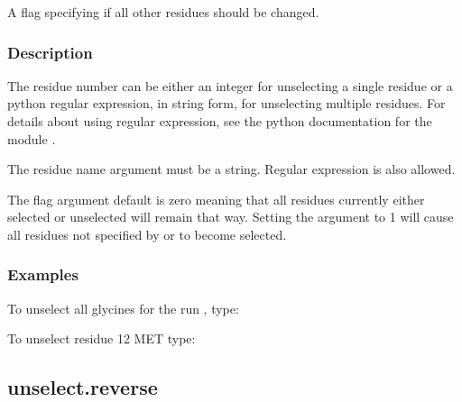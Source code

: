    A flag specifying if all other residues should be changed.  

  

  
 \subsubsection{Description} 

 The residue number can be either an integer for unselecting a single residue or a python regular expression, in string form, for unselecting multiple residues.  For details about using regular expression, see the python documentation for the module . 
  

 The residue name argument must be a string.  Regular expression is also allowed. 
  

 The  flag argument default is zero meaning that all residues currently either selected or unselected will remain that way.  Setting the argument to 1 will cause all residues not specified by  or  to become selected. 
  

  
 \subsubsection{Examples} 

 To unselect all glycines for the run , type: 
  



 To unselect residue 12 MET type: 
  






  

 \newpage 

 \subsection{unselect.reverse} 

